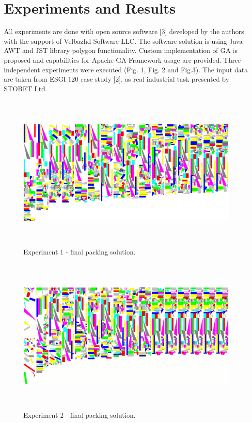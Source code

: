 \documentclass{llncs}
\begin{document}
\section{Experiments and Results}
%
All experiments are done with open source software [3] developed by the authors with the support of Velbazhd Software LLC. The software solution is using Java AWT and JST library polygon functionality. Custom implementation of GA is proposed and capabilities for Apache GA Framework usage are provided. Three independent experiments were executed (Fig. 1, Fig. 2 and Fig.3). The input data are taken from ESGI 120 case study [2], as real industrial task presented by STOBET Ltd.
%
\begin{figure}
	\centering
	\includegraphics[width=12.62cm,height=7.88cm]{fig01.png}
	\caption{Experiment 1 - final packing solution.}
	\label{fig:Graph}
\end{figure}
%
\begin{figure}
	\centering
	\includegraphics[width=12.62cm,height=7.88cm]{fig02.png}
	\caption{Experiment 2 - final packing solution.}
	\label{fig:Graph}
\end{figure}
\end{document}
